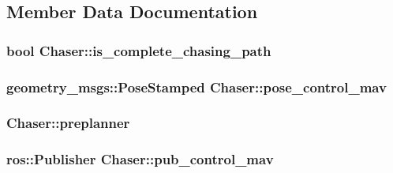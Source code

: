 \subsection{Member Data Documentation}
\subsubsection[{\texorpdfstring{is\+\_\+complete\+\_\+chasing\+\_\+path}{is_complete_chasing_path}}]{\setlength{\rightskip}{0pt plus 5cm}bool Chaser\+::is\+\_\+complete\+\_\+chasing\+\_\+path}\hypertarget{class_chaser_a53af032471ad6bdc828c4eae78085813}{}\label{class_chaser_a53af032471ad6bdc828c4eae78085813}
\subsubsection[{\texorpdfstring{pose\+\_\+control\+\_\+mav}{pose_control_mav}}]{\setlength{\rightskip}{0pt plus 5cm}geometry\+\_\+msgs\+::\+Pose\+Stamped Chaser\+::pose\+\_\+control\+\_\+mav\hspace{0.3cm}{\ttfamily [private]}}\hypertarget{class_chaser_aadbc227c0bffe031c6411f8e00330f3f}{}\label{class_chaser_aadbc227c0bffe031c6411f8e00330f3f}
\subsubsection[{\texorpdfstring{preplanner}{preplanner}}]{ Chaser\+::preplanner\hspace{0.3cm}{\ttfamily [private]}}\hypertarget{class_chaser_a090edb4f4bdb9da847f0980d3b188c57}{}\label{class_chaser_a090edb4f4bdb9da847f0980d3b188c57}
\subsubsection[{\texorpdfstring{pub\+\_\+control\+\_\+mav}{pub_control_mav}}]{\setlength{\rightskip}{0pt plus 5cm}ros\+::\+Publisher Chaser\+::pub\+\_\+control\+\_\+mav\hspace{0.3cm}{\ttfamily [private]}}\hypertarget{class_chaser_a6eae070c2bad84e685bee6ce046245e3}{}\label{class_chaser_a6eae070c2bad84e685bee6ce046245e3}
